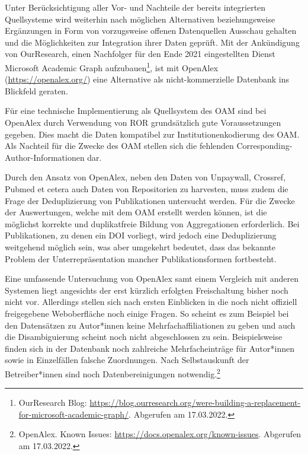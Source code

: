 \documentclass[a4paper,
fontsize=11pt,
oneside,
numbers=noperiodatend,
parskip=half-,
bibliography=totoc,
final
]{scrartcl}
\begin{document}
Unter Berücksichtigung aller Vor- und Nachteile der bereits integrierten
Quellsysteme wird weiterhin nach möglichen Alternativen beziehungsweise
Ergänzungen in Form von vorzugsweise offenen Datenquellen Ausschau
gehalten und die Möglichkeiten zur Integration ihrer Daten geprüft. Mit
der Ankündigung von OurResearch, einen Nachfolger für den Ende 2021
eingestellten Dienst Microsoft Academic Graph aufzubauen\footnote{OurResearch
  Blog:
  \url{https://blog.ourresearch.org/were-building-a-replacement-for-microsoft-academic-graph/}.
  Abgerufen am 17.03.2022.}, ist mit OpenAlex
(\url{https://openalex.org/}) eine Alternative als nicht-kommerzielle
Datenbank ins Blickfeld geraten.

Für eine technische Implementierung als Quellsystem des OAM sind bei
OpenAlex durch Verwendung von ROR grundsätzlich gute Voraussetzungen
gegeben. Dies macht die Daten kompatibel zur Institutionenkodierung des
OAM. Als Nachteil für die Zwecke des OAM stellen sich die fehlenden
Corresponding-Author-Informationen dar.

Durch den Ansatz von OpenAlex, neben den Daten von Unpaywall, Crossref,
Pubmed et cetera auch Daten von Repositorien zu harvesten, muss zudem
die Frage der Deduplizierung von Publikationen untersucht werden. Für
die Zwecke der Auswertungen, welche mit dem OAM erstellt werden können,
ist die möglichst korrekte und duplikatfreie Bildung von Aggregationen
erforderlich. Bei Publikationen, zu denen ein DOI vorliegt, wird jedoch
eine Deduplizierung weitgehend möglich sein, was aber umgekehrt
bedeutet, dass das bekannte Problem der Unterrepräsentation mancher
Publikationsformen fortbesteht.

Eine umfassende Untersuchung von OpenAlex samt einem Vergleich mit
anderen Systemen liegt angesichts der erst kürzlich erfolgten
Freischaltung bisher noch nicht vor. Allerdings stellen sich nach ersten
Einblicken in die noch nicht offiziell freigegebene Weboberfläche noch
einige Fragen. So scheint es zum Beispiel bei den Datensätzen zu
Autor*innen keine Mehrfachaffiliationen zu geben und auch die
Disambiguierung scheint noch nicht abgeschlossen zu sein. Beispielsweise
finden sich in der Datenbank noch zahlreiche Mehrfacheinträge für
Autor*innen sowie in Einzelfällen falsche Zuordnungen. Nach
Selbstauskunft der Betreiber*innen sind noch Datenbereinigungen
notwendig.\footnote{OpenAlex. Known Issues:
  \url{https://docs.openalex.org/known-issues}. Abgerufen am 17.03.2022.}
\end{document}
